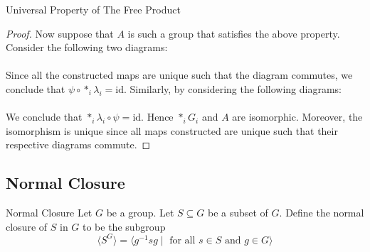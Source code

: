 \documentclass[a4paper]{article}
\begin{document}
\begin{prp}{Universal Property of The Free Product}{}
\begin{proof}
Now suppose that $A$ is such a group that satisfies the above property. Consider the following two diagrams: \\
 \\
Since all the constructed maps are unique such that the diagram commutes, we conclude that $\psi\circ\ast_i\lambda_i=\text{id}$. Similarly, by considering the following diagrams: \\
 \\
We conclude that $\ast_i\lambda_i\circ\psi=\text{id}$. Hence $\ast_iG_i$ and $A$ are isomorphic. Moreover, the isomorphism is unique since all maps constructed are unique such that their respective diagrams commute. 
\end{proof}
\end{prp}

\subsection{Normal Closure}
\begin{defn}{Normal Closure}{} Let $G$ be a group. Let $S\subseteq G$ be a subset of $G$. Define the normal closure of $S$ in $G$ to be the subgroup $$\langle S^G\rangle=\langle g^{-1}sg\;|\;\text{ for all }s\in S\text{ and }g\in G\rangle$$
\end{defn}
\end{document}

